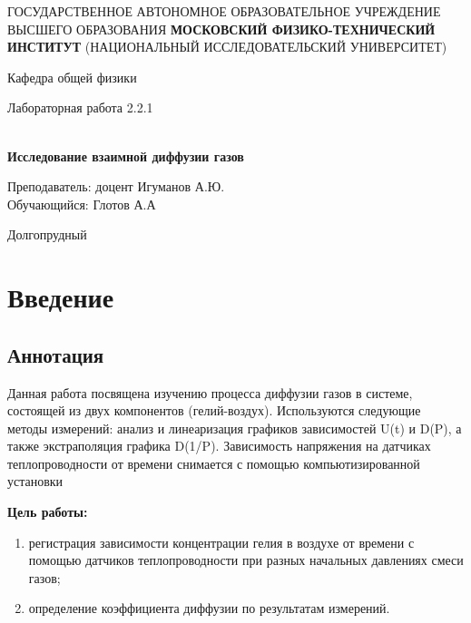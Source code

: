 \documentclass[12pt,a4paper]{article}
\author{Глотов Алексей}
\begin{document}
\newpage
\begin{center}
\footnotesize{{ГОСУДАРСТВЕННОЕ АВТОНОМНОЕ ОБРАЗОВАТЕЛЬНОЕ УЧРЕЖДЕНИЕ}\break
{ВЫСШЕГО ОБРАЗОВАНИЯ}
\break
{\bf {МОСКОВСКИЙ ФИЗИКО-ТЕХНИЧЕСКИЙ ИНСТИТУТ}}
\break
\small{(НАЦИОНАЛЬНЫЙ ИССЛЕДОВАТЕЛЬСКИЙ УНИВЕРСИТЕТ)}}
\break
\hfill \break
\hfill \break
\begin{center}
\normalsize{Кафедра общей физики}
\end{center}
\hfill \break
\hfill \break
\hfill \break
\hfill \break

\begin{center}
\normalsize {Лабораторная работа 2.2.1}
\end{center}
\hfill \break\\
\large{\textbf{Исследование взаимной диффузии газов}}
\end{center}
\begin{flushleft}
\hfill \break
\hfill \break
\hfill \break
\hfill \break
\hfill \break
\hfill \break
\hfill \break
\hfill \break
\hfill \break
\hfill \break
\hangindent=9cm
\normalsize{Преподаватель:}\hfill
\normalsize{доцент Игуманов А.Ю.}\\
\hfill \break
\normalsize{Обучающийся:}\hfill
\normalsize{Глотов А.А} \\
\hfill \break
\end{flushleft}
\hfill \break
\hfill \break
\hfill \break
\hfill \break
\hfill \break
\hfill \break
\hfill \break
\hfill \break
\hfill \break
\hfill \break
\hfill \break

\begin{center}
Долгопрудный 
\end{center}
\thispagestyle{empty}
\section{Введение}

\subsection{Аннотация}

Данная работа посвящена изучению процесса диффузии газов в системе, состоящей из двух компонентов (гелий-воздух). Используются следующие методы измерений: анализ и линеаризация графиков зависимостей U(t) и D(P), а также экстраполяция графика D(1/P). Зависимость напряжения на датчиках теплопроводности от времени снимается с помощью компьютизированной установки

\textbf{Цель работы:}  \begin{enumerate}
	\item регистрация зависимости концентрации гелия в воздухе от времени с помощью датчиков теплопроводности при разных начальных давлениях смеси газов;
	\item определение коэффициента диффузии по результатам измерений.
\end{enumerate}
\end{document}
